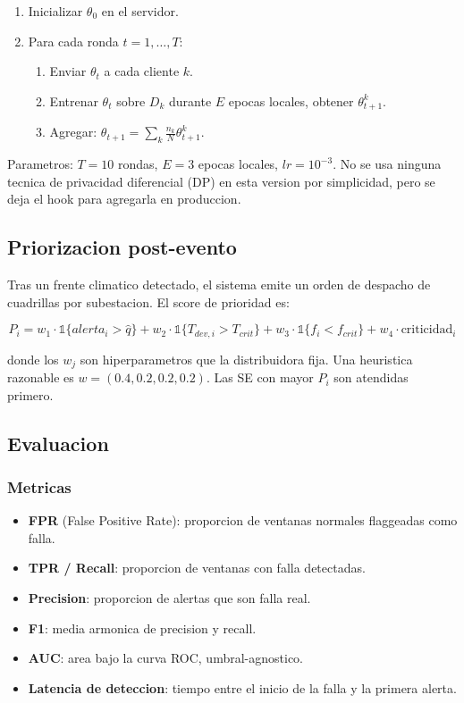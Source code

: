 \begin{enumerate}[leftmargin=*,itemsep=2pt]
  \item Inicializar $\theta_0$ en el servidor.
  \item Para cada ronda $t = 1, \dots, T$:
  \begin{enumerate}
    \item Enviar $\theta_t$ a cada cliente $k$.
    \item Entrenar $\theta_t$ sobre $D_k$ durante $E$ epocas
          locales, obtener $\theta^k_{t+1}$.
    \item Agregar: $\theta_{t+1} = \sum_k \frac{n_k}{N} \theta^k_{t+1}$.
  \end{enumerate}
\end{enumerate}

Parametros: $T = 10$ rondas, $E = 3$ epocas locales, $lr = 10^{-3}$.
No se usa ninguna tecnica de privacidad diferencial (DP) en esta
version por simplicidad, pero se deja el hook para agregarla en
produccion.

\subsection{Priorizacion post-evento}

Tras un frente climatico detectado, el sistema emite un orden de
despacho de cuadrillas por subestacion. El score de prioridad es:

\[
P_i = w_1 \cdot \mathbb{1}\{alerta_i > \hat{q}\}
    + w_2 \cdot \mathbb{1}\{T_{dev,i} > T_{crit}\}
    + w_3 \cdot \mathbb{1}\{f_i < f_{crit}\}
    + w_4 \cdot \text{criticidad}_i
\]

donde los $w_j$ son hiperparametros que la distribuidora fija. Una
heuristica razonable es $w = (0.4, 0.2, 0.2, 0.2)$. Las SE con mayor
$P_i$ son atendidas primero.

\subsection{Evaluacion}

\subsubsection{Metricas}

\begin{itemize}[leftmargin=*,itemsep=2pt]
  \item \textbf{FPR} (False Positive Rate): proporcion de ventanas
        normales flaggeadas como falla.
  \item \textbf{TPR / Recall}: proporcion de ventanas con falla
        detectadas.
  \item \textbf{Precision}: proporcion de alertas que son falla real.
  \item \textbf{F1}: media armonica de precision y recall.
  \item \textbf{AUC}: area bajo la curva ROC, umbral-agnostico.
  \item \textbf{Latencia de deteccion}: tiempo entre el inicio de la
        falla y la primera alerta.
\end{itemize}

